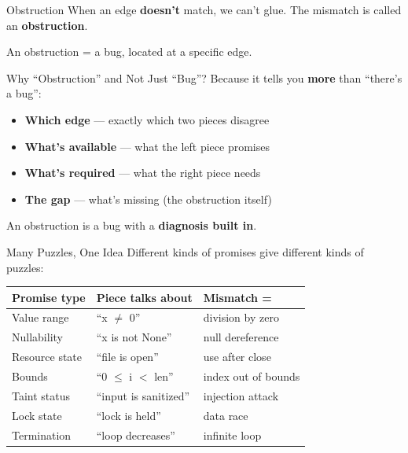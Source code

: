 \documentclass[aspectratio=169,10pt]{beamer}
\begin{document}
\begin{frame}{Obstruction}
When an edge \textbf{doesn't} match, we can't glue. The mismatch is called an \textbf{obstruction}.
\vspace{0.5em}
\begin{center}
\end{center}
\vspace{0.3em}
An obstruction = a bug, located at a specific edge.
\end{frame}

\begin{frame}{Why ``Obstruction'' and Not Just ``Bug''?}
Because it tells you \textbf{more} than ``there's a bug'':
\vspace{0.3em}
\begin{itemize}
  \item \textbf{Which edge} --- exactly which two pieces disagree
  \item \textbf{What's available} --- what the left piece promises
  \item \textbf{What's required} --- what the right piece needs
  \item \textbf{The gap} --- what's missing (the obstruction itself)
\end{itemize}
\vspace{0.3em}
An obstruction is a bug with a \textbf{diagnosis built in}.
\end{frame}

\begin{frame}{Many Puzzles, One Idea}
Different kinds of promises give different kinds of puzzles:
\vspace{0.3em}
{\small
\begin{tabular}{@{}lll@{}}
\textbf{Promise type}  & \textbf{Piece talks about} & \textbf{Mismatch =} \\
\hline
Value range       & ``x $\neq$ 0''             & division by zero \\
Nullability       & ``x is not None''          & null dereference \\
Resource state    & ``file is open''           & use after close \\
Bounds            & ``0 $\le$ i $<$ len''      & index out of bounds \\
Taint status      & ``input is sanitized''     & injection attack \\
Lock state        & ``lock is held''           & data race \\
Termination       & ``loop decreases''         & infinite loop \\
\end{tabular}}
\end{frame}
\end{document}
